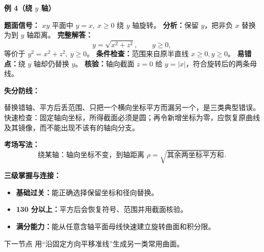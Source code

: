 \begin{knowledgeBox}
\textbf{例 4（绕 \(y\) 轴）}

\textbf{题面信号：} \(xy\) 平面中 \(y=x,\ x\ge0\) 绕 \(y\) 轴旋转。
\textbf{分析：}保留 \(y\)，把非负 \(x\) 替换为到 \(y\) 轴距离。
\textbf{完整解答：}
\[
y=\sqrt{x^2+z^2},\qquad y\ge0,
\]
等价于 \(y^2=x^2+z^2,\ y\ge0\)。
\textbf{条件检查：}范围来自原半直线 \(x\ge0,y\ge0\)。
\textbf{易错点：}绕 \(y\) 轴却仍替换 \(y\)。
\textbf{核验：}轴向截面 \(z=0\) 给 \(y=|x|\)，符合旋转后的两条母线。

\textbf{失分防线：}

替换错轴、平方后丢范围、只把一个横向坐标平方而漏另一个，是三类典型错误。
快速检查：固定轴向坐标，所得截面必须是圆；再令新增坐标为零，应恢复原曲线
及其镜像，而不能出现不该有的轴向分支。

\textbf{考场写法：}
\[
\boxed{\text{绕某轴：轴向坐标不变，到轴距离 }
\rho=\sqrt{\text{其余两坐标平方和}}.}
\]

\textbf{三级掌握与连接：}
\begin{itemize}
  \item \textbf{基础过关：}能正确选择保留坐标和径向替换。
  \item \textbf{130 分以上：}平方后会恢复符号、范围并用截面核验。
  \item \textbf{满分能力：}能从任意含轴平面母线快速建立旋转曲面和积分限。
\end{itemize}
下一节点 
用“沿固定方向平移准线”生成另一类常用曲面。
\end{knowledgeBox}



